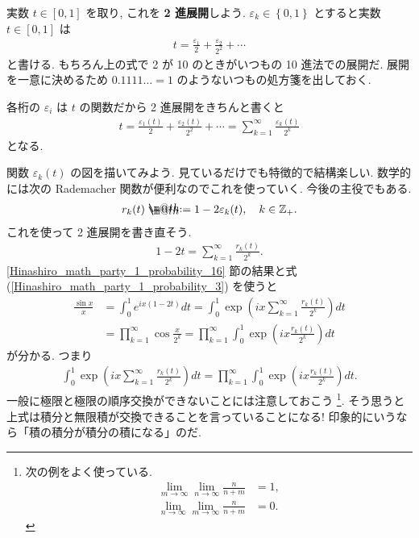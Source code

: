 \documentclass[openany, a4paper, oneside]{jsbook}
\makeatletter
\newcommand*{\defeq}{\mathrel{\rlap{%
\raisebox{0.3ex}{$\m@th\cdot$}}%
\raisebox{-0.3ex}{$\m@th\cdot$}}%
=}
\theoremstyle{break}
\theoremstyle{breakdefn}
\newcommand{\rbk}[1]{\left (#1\right)}
\newcommand{\sqbk}[1]{\left[#1\right]}
\newcommand{\cbk}[1]{\left\{#1\right\}}
\newcommand{\bbZ}{\mathbb{Z}}
\newcommand{\limntoinfty}{\lim_{n \to \infty}}
\makeatother
\begin{document}
実数 $t \in \sqbk{0, 1}$ を取り, これを \textbf{2 進展開}しよう.
$\varepsilon_k \in \cbk{0, 1}$ とすると実数 $t \in \sqbk{0, 1}$ は
\begin{align}
 t
 =
 \frac{\varepsilon_1}{2} + \frac{\varepsilon_2}{2^2} + \cdots
\end{align}
と書ける.
もちろん上の式で 2 が 10 のときがいつもの 10 進法での展開だ.
展開を一意に決めるため $0.1111 \dots = 1$ のようないつもの処方箋を出しておく.

各桁の $\varepsilon_i$ は $t$ の関数だから 2 進展開をきちんと書くと
\begin{align}
 t
 =
 \frac{\varepsilon_1 (t)}{2} + \frac{\varepsilon_2 (t)}{2^2} + \cdots
 =
 \sum_{k=1}^{\infty} \frac{\varepsilon_k (t)}{2^k}
\end{align}
となる.

関数 $\varepsilon_k (t)$ の図を描いてみよう.
見ているだけでも特徴的で結構楽しい.
数学的には次の Rademacher 関数が便利なのでこれを使っていく.
今後の主役でもある.
\begin{align}
 r_k (t)
 \defeq
 1 - 2 \varepsilon_k (t), \quad k \in \bbZ_+. \label{Hinashiro_math_party_1_probability_4}
\end{align}
これを使って 2 進展開を書き直そう.
\begin{align}
 1 - 2 t
 =
 \sum_{k=1}^{\infty} \frac{r_k (t)}{2^k}. \label{Hinashiro_math_party_1_probability_19}
\end{align}
\ref{Hinashiro_math_party_1_probability_16} 節の結果と式 (\ref{Hinashiro_math_party_1_probability_3}) を使うと
\begin{align}
 \frac{\sin x}{x}
 &=
 \int_{0}^1 e^{ix (1 - 2t)} dt
 =
 \int_{0}^1 \exp \rbk{ix \sum_{k=1}^{\infty} \frac{r_k (t)}{2^k}} dt \\
 &=
 \prod_{k=1}^{\infty} \cos \frac{x}{2^{k}}
 =
 \prod_{k=1}^{\infty} \int_0^1 \exp \rbk{i x \frac{r_k (t)}{2^k}} dt \label{Hinashiro_math_party_1_probability_5}
\end{align}
が分かる.
つまり
\begin{align}
 \int_{0}^1 \exp \rbk{ix \sum_{k=1}^{\infty} \frac{r_k (t)}{2^k}} dt
 =
 \prod_{k=1}^{\infty} \int_0^1 \exp \rbk{i x \frac{r_k (t)}{2^k}} dt.
\end{align}
一般に極限と極限の順序交換ができないことには注意しておこう \footnote{次の例をよく使っている.
\begin{align}
 \lim_{m \to \infty} \limntoinfty \frac{n}{n+m} &= 1, \\
 \limntoinfty \lim_{m \to \infty} \frac{n}{n+m} &= 0.
\end{align}
 }.
そう思うと上式は積分と無限積が交換できることを言っていることになる!
印象的にいうなら「積の積分が積分の積になる」のだ.
\end{document}
